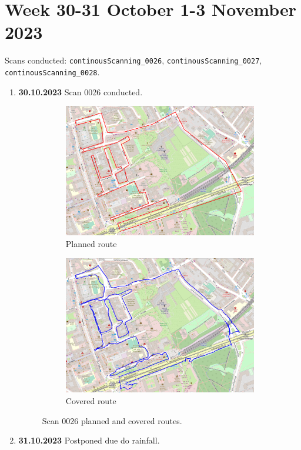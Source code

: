\documentclass[a4paper,12pt]{article}
\begin{document}
\section{Week 30-31 October 1-3 November 2023}
Scans conducted: \verb|continousScanning_0026|, \verb|continousScanning_0027|, \verb|continousScanning_0028|.\\
\begin{enumerate}
	\item \textbf{30.10.2023} Scan 0026 conducted.
	\begin{figure}[H]
		\centering
		\begin{subfigure}{.95\textwidth}
			\centering
			\includegraphics[width=1\linewidth]{route_p26}
			\caption{Planned route}
			\label{fig:a26}
		\end{subfigure}%
		\linebreak
		\begin{subfigure}{.95\textwidth}
			\centering
			\includegraphics[width=1\linewidth]{route_c26}
			\caption{Covered route}
			\label{fig:b26}
		\end{subfigure}
		\caption{Scan 0026 planned and covered routes.}
		\label{fig:fig26}
	\end{figure}
	\item \textbf{31.10.2023} Postponed due do rainfall.
	

\end{enumerate}
\end{document}
